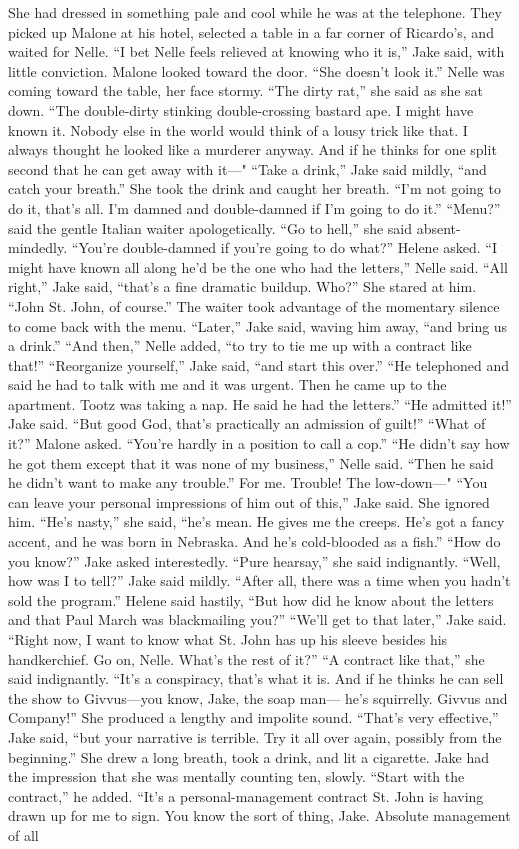 \documentclass{novel}
\begin{document}
She had dressed in something pale and cool while he was at the telephone. They picked up Malone at his hotel, selected a table in a far corner of Ricardo’s, and waited for Nelle. “I bet Nelle feels relieved at knowing who it is,” Jake said, with little conviction. Malone looked toward the door. “She doesn’t look it.” Nelle was coming toward the table, her face stormy. “The dirty rat,” she said as she sat down. “The double-dirty stinking double-crossing bastard ape. I might have known it. Nobody else in the world would think of a lousy trick like that. I always thought he looked like a murderer anyway. And if he thinks for one split second that he can get away with it—" “Take a drink,” Jake said mildly, “and catch your breath.” She took the drink and caught her breath. “I'm not going to do it, that’s all. I’m damned and double-damned if I’m going to do it.” “Menu?” said the gentle Italian waiter apologetically. “Go to hell,” she said absent-mindedly. “You’re double-damned if you’re going to do what?” Helene asked. “I might have known all along he’d be the one who had the letters,” Nelle said. “All right,” Jake said, “that’s a fine dramatic buildup. Who?” She stared at him. “John St. John, of course.” The waiter took advantage of the momentary silence to come back with the menu. “Later,” Jake said, waving him away, “and bring us a drink.” “And then,” Nelle added, “to try to tie me up with a contract like that!” “Reorganize yourself,” Jake said, “and start this over.” “He telephoned and said he had to talk with me and it was urgent. Then he came up to the apartment. Tootz was taking a nap. He said he had the letters.” “He admitted it!” Jake said. “But good God, that’s practically an admission of guilt!” “What of it?” Malone asked. “You’re hardly in a position to call a cop.” “He didn’t say how he got them except that it was none of my business,” Nelle said. “Then he said he didn’t want to make any trouble.” For me. Trouble! The low-down—" “You can leave your personal impressions of him out of this,” Jake said. She ignored him. “He’s nasty,” she said, “he’s mean. He gives me the creeps. He’s got a fancy accent, and he was born in Nebraska. And he’s cold-blooded as a fish.” “How do you know?” Jake asked interestedly. “Pure hearsay,” she said indignantly. “Well, how was I to tell?” Jake said mildly. “After all, there was a time when you hadn’t sold the program.” Helene said hastily, “But how did he know about the letters and that Paul March was blackmailing you?” “We’ll get to that later,” Jake said. “Right now, I want to know what St. John has up his sleeve besides his handkerchief. Go on, Nelle. What’s the rest of it?” “A contract like that,” she said indignantly. “It’s a conspiracy, that’s what it is. And if he thinks he can sell the show to Givvus—you know, Jake, the soap man— he’s squirrelly. Givvus and Company!” She produced a lengthy and impolite sound. “That’s very effective,” Jake said, “but your narrative is terrible. Try it all over again, possibly from the beginning.” She drew a long breath, took a drink, and lit a cigarette. Jake had the impression that she was mentally counting ten, slowly. “Start with the contract,” he added. “It’s a personal-management contract St. John is having drawn up for me to sign. You know the sort of thing, Jake. Absolute management of all 
\end{document}
